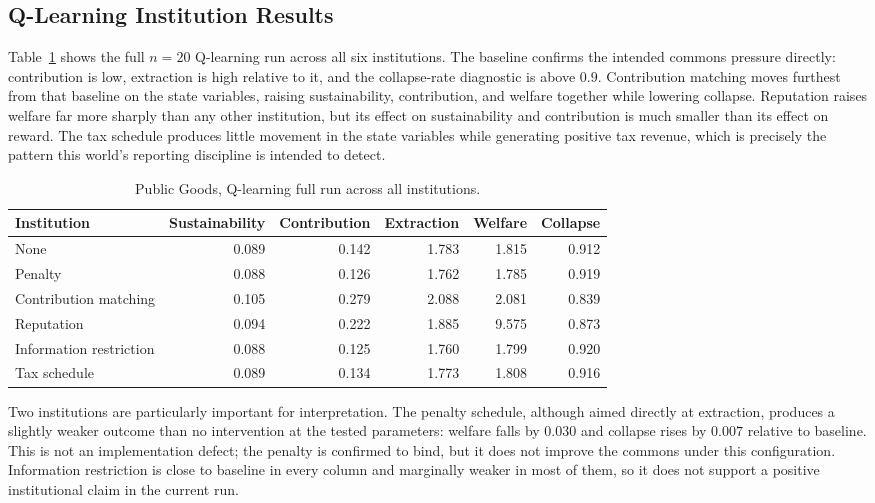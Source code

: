 \documentclass[11pt]{article}
\begin{document}
\subsection{Q-Learning Institution Results}

Table~\ref{tab:public-goods-qlearning} shows the full \(n=20\) Q-learning run
across all six institutions. The baseline confirms the intended commons
pressure directly: contribution is low, extraction is high relative to it, and
the collapse-rate diagnostic is above \(0.9\). Contribution matching moves
furthest from that baseline on the state variables, raising sustainability,
contribution, and welfare together while lowering collapse. Reputation raises
welfare far more sharply than any other institution, but its effect on
sustainability and contribution is much smaller than its effect on reward. The
tax schedule produces little movement in the state variables while generating
positive tax revenue, which is precisely the pattern this world's reporting
discipline is intended to detect.

\begin{table}[h]
\centering
\begin{tabular}{lrrrrr}
\toprule
Institution & Sustainability & Contribution & Extraction & Welfare & Collapse \\
\midrule
None & 0.089 & 0.142 & 1.783 & 1.815 & 0.912 \\
Penalty & 0.088 & 0.126 & 1.762 & 1.785 & 0.919 \\
Contribution matching & 0.105 & 0.279 & 2.088 & 2.081 & 0.839 \\
Reputation & 0.094 & 0.222 & 1.885 & 9.575 & 0.873 \\
Information restriction & 0.088 & 0.125 & 1.760 & 1.799 & 0.920 \\
Tax schedule & 0.089 & 0.134 & 1.773 & 1.808 & 0.916 \\
\bottomrule
\end{tabular}
\caption{Public Goods, Q-learning full run across all institutions.}
\label{tab:public-goods-qlearning}
\end{table}

Two institutions are particularly important for interpretation. The penalty
schedule, although aimed directly at extraction, produces a slightly weaker
outcome than no intervention at the tested parameters: welfare falls by
\(0.030\) and collapse rises by \(0.007\) relative to baseline. This is not an
implementation defect; the penalty is confirmed to bind, but it does not improve
the commons under this configuration. Information restriction is close to
baseline in every column and marginally weaker in most of them, so it does not
support a positive institutional claim in the current run.
\end{document}
